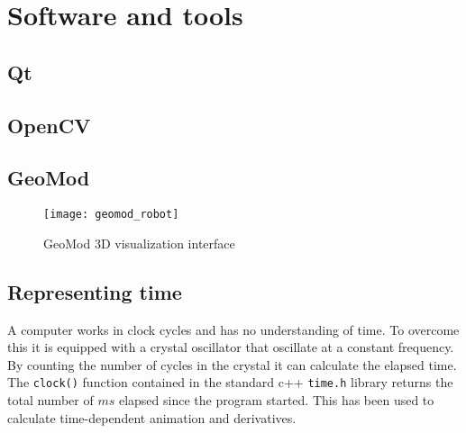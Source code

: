 \chapter{Software and tools}

\section{Qt}

\section{OpenCV}


\section{GeoMod}


\begin{figure}
 \centering 
 \texttt{[image: geomod\_robot]}
 \caption{GeoMod 3D visualization interface}
 \label{geomod_interface}
\end{figure}

\section{Representing time}

A computer works in clock cycles and has no understanding of time. To overcome this it is equipped with a crystal oscillator that oscillate at a constant frequency. By counting the number of cycles in the crystal it can calculate the elapsed time. The \texttt{clock()} function contained in the standard c++ \texttt{time.h} library returns the total number of $ms$ elapsed since the program started. This has been used to calculate time-dependent animation and derivatives.